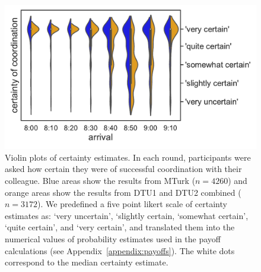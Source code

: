 \documentclass[twocolumn,a4paper,superscriptaddress,nofootinbib]{revtex4}
\begin{document}
\begin{figure} %
\centering\includegraphics[width=0.8\linewidth]{fig2_certainties}
\caption{Violin plots of certainty estimates. In each round, participants were asked how certain they were of successful coordination with their colleague. Blue areas show the results from MTurk ($n=4260$) and orange areas show the results from DTU1 and DTU2 combined ($n=3172$). We predefined a five point likert scale of certainty estimates as: `very uncertain', `slightly certain, `somewhat certain', `quite certain', and `very certain', and translated them into the numerical values of probability estimates used in the payoff calculations (see Appendix~\ref{appendix:payoffs}). The white dots correspond to the median certainty estimate.}
\label{fig:certain}
\end{figure}
\end{document}
